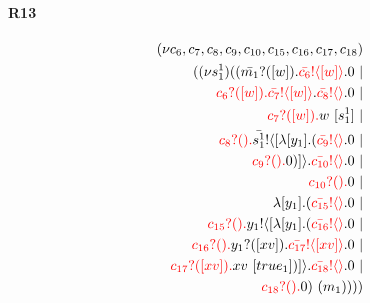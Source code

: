\documentclass{article}
\begin{document}
\paragraph{R13}
\begin{align*}
 (\nu c_{6},c_{7},c_{8},c_{9},c_{10},c_{15},c_{16},c_{17},c_{18}) \\ ( (\nu s^{1}_{1})((\color{black}\bar{m_{1}}?([w]).\color{black}\color{red}\bar{c_{6}}! \langle [w] \rangle \color{black}.0  \ | \\ \color{red}c_{6}?([w]).\color{black}\color{red}\bar{c_{7}}! \langle [w] \rangle \color{black}.\color{red}\bar{c_{8}}! \langle  \rangle \color{black}.0  \ | \\ \color{red}c_{7}?([w]).\color{black}w \ [s^{1}_{1}] \ | \\ \color{red}c_{8}?().\color{black}\color{black}\bar{s^{1}_{1}}! \langle [ \lambda [y_{1}].(\color{red}\bar{c_{9}}! \langle  \rangle \color{black}.0  \ | \\ \color{red}c_{9}?().\color{black}0 )] \rangle \color{black}.\color{red}\bar{c_{10}}! \langle  \rangle \color{black}.0  \ | \\ \color{red}c_{10}?().\color{black}0  \ | \\  \lambda [y_{1}].(\color{red}\bar{c_{15}}! \langle  \rangle \color{black}.0  \ | \\ \color{red}c_{15}?().\color{black}\color{black}y_{1}! \langle [ \lambda [y_{1}].(\color{red}\bar{c_{16}}! \langle  \rangle \color{black}.0  \ | \\ \color{red}c_{16}?().\color{black}\color{black}y_{1}?([xv]).\color{black}\color{red}\bar{c_{17}}! \langle [xv] \rangle \color{black}.0  \ | \\ \color{red}c_{17}?([xv]).\color{black}xv \ [true_{1}])] \rangle \color{black}.\color{red}\bar{c_{18}}! \langle  \rangle \color{black}.0  \ | \\ \color{red}c_{18}?().\color{black}0 ) \ (m_{1}))))
\end{align*}
\end{document}
